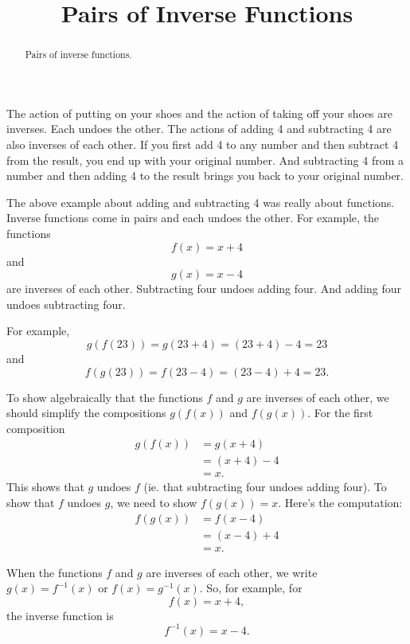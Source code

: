 \documentclass{ximera}
\title{Pairs of Inverse Functions}
\begin{document}
\begin{abstract}
Pairs of inverse functions.
\end{abstract}
\maketitle

The action of putting on your shoes and the action of taking off your shoes are inverses. Each undoes the other. The actions of adding 4 and subtracting 4 are also inverses of each other. If you first add 4 to any number and then subtract 4 from the result, you end up with your original number. And subtracting 4 from a number and then adding 4 to the result brings you back to your original number. 


\begin{example} \label{Exd445t667}
The above example about adding and subtracting 4 was really about functions. Inverse functions come in pairs and each undoes the other. For example, the functions 
\[
    f(x) = x + 4
\]
and 
\[
  g(x) = x-4
\]
are inverses of each other. Subtracting four undoes adding four. And adding four undoes subtracting four.

For example,
\[
    g(f(23)) = g(23+4) =  (23+4) -4 = 23
\]
and
\[
    f(g(23)) = f(23-4) = (23-4) + 4 = 23 .
\]

To show algebraically that the functions $f$ and $g$ are inverses of each other, we should simplify the compositions $g(f(x))$ and $f(g(x))$. For the first composition
\begin{align*}
          g(f(x)) &= g(x+4)  \\
                    &= (x+4) - 4 \\
                    & = x .
\end{align*}
This shows that $g$ undoes $f$ (ie. that subtracting four undoes adding four). To show that $f$ undoes $g$, we need to show $f(g(x))=x$. Here's the computation:
\begin{align*}
          f(g(x)) &= f(x-4)  \\
                    &= (x-4) + 4 \\
                    & = x .
\end{align*}


\end{example}



When the functions $f$ and $g$ are inverses of each other, we write $g(x) = f^{-1}(x)$ or $f(x) = g^{-1}(x)$. So, for example, for 
\[
   f(x) = x+4 ,
\]
the inverse function is
\[
   f^{-1}(x) = x-4.
\]
\end{document}
